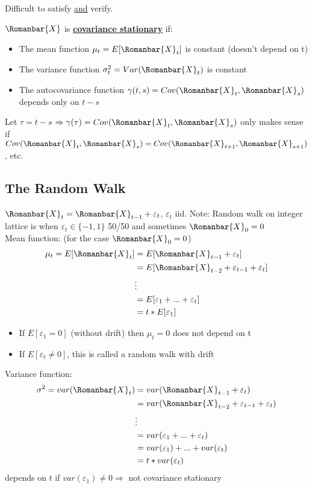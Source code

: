 \bigskip

Difficult to satisfy \underline{and} verify.

$\Romanbar{X}$ is \textbf{\underline{covariance stationary}} if:
\begin{itemize}
    \item The mean function $\mu_t=E[\Romanbar{X}_t]$ is constant (doesn't depend on t)
    \item The variance function $\sigma^2_t=Var(\Romanbar{X}_t)$ is constant
    \item The autocovariance function $\gamma(t,s)=Cov(\Romanbar{X}_t,\Romanbar{X}_s)$ depends only on $t-s$
\end{itemize}

Let $\tau=t-s$ $\Rightarrow \gamma(\tau) = Cov(\Romanbar{X}_t, \Romanbar{X}_s)$ only makes sense if $Cov(\Romanbar{X}_t,\Romanbar{X}_s)=Cov(\Romanbar{X}_{t+1},\Romanbar{X}_{s+1})$, etc.


\subsection{The Random Walk}

$\Romanbar{X}_t=\Romanbar{X}_{t-1}+\varepsilon_t$, $\varepsilon_t$ iid.
\quad Note: Random walk on integer lattice is when $\varepsilon_t \in \{-1,1\}$ 50/50 and sometimes $\Romanbar{X}_0=0$  \\

Mean function: \quad (for the case $\Romanbar{X}_0=0$)
\begin{align*}
    \mu_t=E[\Romanbar{X}_t] &= E[\Romanbar{X}_{t-1} + \varepsilon_t]\\
    &=E[\Romanbar{X}_{t-2}+\varepsilon_{t-1}+\varepsilon_t] \\
    & \vdots\\
    &=E[\varepsilon_1+...+\varepsilon_t] \\
    &=t * E[\varepsilon_1]
\end{align*}
\begin{itemize}
    \item If $E[\varepsilon_1=0]$ (without drift) then $\mu_t=0$ does not depend on t
    \item If $E[\varepsilon_t\neq 0]$, this is called a random walk with drift
\end{itemize}

Variance function:
\begin{align*}
    \sigma^2=var(\Romanbar{X}_t)&=var(\Romanbar{X}_{t-1} + \varepsilon_t)\\
    &=var(\Romanbar{X}_{t-2} + \varepsilon_{t-1} + \varepsilon_t) \\
    &\vdots \\
    &=var(\varepsilon_1+...+\varepsilon_t)\\
    &=var(\varepsilon_1)+...+var(\varepsilon_t)\\
    &=t * var(\varepsilon_t)
\end{align*}
\quad  \quad depends on $t$ if $var(\varepsilon_1)\neq 0 \Rightarrow$ not covariance stationary \\


